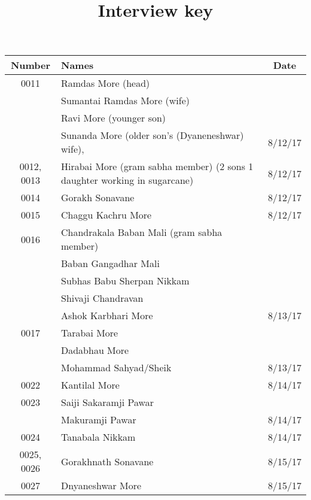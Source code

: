 \documentclass{article}
\title{Interview key}
\author{}
\date{}
\begin{document}
\maketitle

\begin{center}
\begin{tabular}{| c|p{5cm}| c|}
\hline
Number & Names & Date\\
\hline
0011 & Ramdas More (head) & \\ & Sumantai Ramdas More (wife) & \\ & Ravi More (younger son) & \\ & Sunanda More (older son's (Dyaneneshwar) wife), & 8/12/17\\
\hline
0012, 0013 & Hirabai More (gram sabha member) (2 sons 1 daughter working in sugarcane) & 8/12/17\\
\hline
0014 & Gorakh Sonavane & 8/12/17\\
\hline
0015 & Chaggu Kachru More & 8/12/17\\
\hline
0016 & Chandrakala Baban Mali (gram sabha member) & \\ & Baban Gangadhar Mali & \\ & Subhas Babu Sherpan Nikkam & \\ & Shivaji Chandravan & \\ & Ashok Karbhari More & 8/13/17\\
\hline
0017 & Tarabai More & \\ & Dadabhau More & \\ & Mohammad Sahyad/Sheik & 8/13/17\\
\hline
0022 & Kantilal More & 8/14/17\\
\hline
0023 & Saiji Sakaramji Pawar & \\ & Makuramji Pawar & 8/14/17\\
\hline
0024 & Tanabala Nikkam & 8/14/17\\
\hline
0025, 0026 & Gorakhnath Sonavane & 8/15/17\\
\hline
0027 & Dnyaneshwar More & 8/15/17\\
\hline
\end{tabular}
\end{center}
\end{document}
